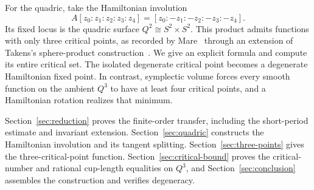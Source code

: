 For the quadric, take the Hamiltonian involution
\[
 A[z_0:z_1:z_2:z_3:z_4]=[z_0:-z_1:-z_2:-z_3:-z_4].
\]
Its fixed locus is the quadric surface $Q^2\cong S^2\times S^2$.
This product admits functions with only three critical points, as
recorded by Mare~\cite[Proposition~3.2.5]{Mare1997} through an extension
of Takens's sphere-product construction~\cite{Takens1968}. We give an
explicit formula and compute its entire critical set. The isolated
degenerate critical point becomes a degenerate Hamiltonian fixed point.
In contrast, symplectic volume forces every smooth function on the
ambient $Q^3$ to have at least four critical points, and a Hamiltonian
rotation realizes that minimum.

Section~\ref{sec:reduction} proves the finite-order transfer, including
the short-period estimate and invariant extension.
Section~\ref{sec:quadric} constructs the Hamiltonian involution and
its tangent splitting. Section~\ref{sec:three-points} gives the
three-critical-point function. Section~\ref{sec:critical-bound}
proves the critical-number and rational cup-length equalities on $Q^3$,
and Section~\ref{sec:conclusion} assembles the construction and
verifies degeneracy.
